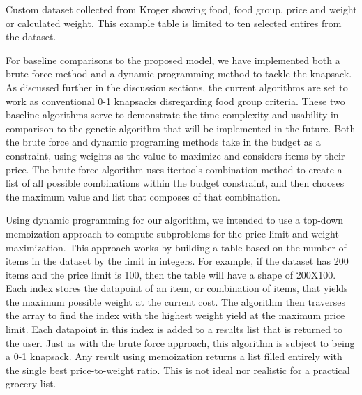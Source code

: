 \documentclass[10pt,journal,compsoc]{IEEEtran}
\begin{document}
\begin{table}[h]
    \setlength\tabcolsep{2pt}
    \centering
    
    \caption{Custom dataset collected from Kroger showing food, food group, price and weight or calculated weight. This example table is limited to ten selected entires from the dataset.}
    \label{table:Example of Groceries Dataset}
\end{table}

For baseline comparisons to the proposed model, we have implemented both a brute
force method and a dynamic programming method to tackle the knapsack. As
discussed further in the discussion sections, the current algorithms are set to
work as conventional 0-1 knapsacks disregarding food group criteria. These two
baseline algorithms serve to demonstrate the time complexity and usability in
comparison to the genetic algorithm that will be implemented in the future. Both
the brute force and dynamic programing methods take in the budget as a
constraint, using weights as the value to maximize and considers items by their
price. The brute force algorithm uses itertools combination method to create a
list of all possible combinations within the budget constraint, and then chooses
the maximum value and list that composes of that combination.

Using dynamic programming for our algorithm, we intended to use a top-down
memoization approach to compute subproblems for the price limit and weight
maximization. This approach works by building a table based on the number of
items in the dataset by the limit in integers. For example, if the dataset has
200 items and the price limit is 100, then the table will have a shape of
200X100. Each index stores the datapoint of an item, or combination of items,
that yields the maximum possible weight at the current cost. The algorithm then
traverses the array to find the index with the highest weight yield at the
maximum price limit. Each datapoint in this index is added to a results list
that is returned to the user. Just as with the brute force approach, this
algorithm is subject to being a 0-1 knapsack. Any result using memoization
returns a list filled entirely with the single best price-to-weight ratio. This
is not ideal nor realistic for a practical grocery list.
\end{document}
